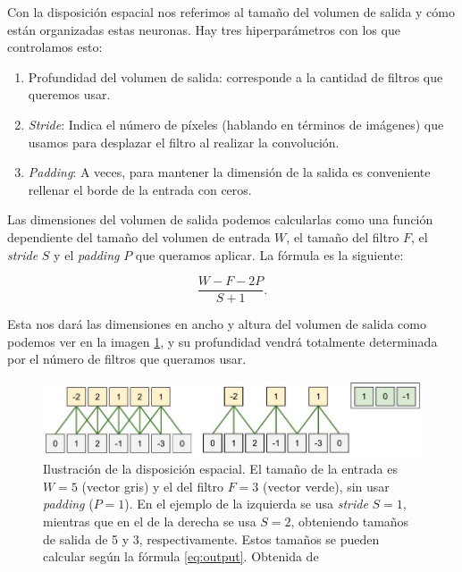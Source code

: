 Con la disposición espacial nos referimos al tamaño del volumen de salida y cómo están organizadas estas neuronas. Hay tres hiperparámetros con los que controlamos esto:

\begin{enumerate}

	\item Profundidad del volumen de salida: corresponde a la cantidad de filtros que queremos usar.
	
	\item \textit{Stride}: Indica el número de píxeles (hablando en términos de imágenes) que usamos para desplazar el filtro al realizar la convolución.
	
	\item \textit{Padding}: A veces, para mantener la dimensión de la salida es conveniente rellenar el borde de la entrada con ceros.

\end{enumerate}


Las dimensiones del volumen de salida podemos calcularlas como una función dependiente del tamaño del volumen de entrada $W$, el tamaño del filtro $F$, el \textit{stride} $S$ y el \textit{padding} $P$ que queramos aplicar. La fórmula es la siguiente:

\begin{equation}\label{eq:output}
\frac{W-F-2P}{S+1}.
\end{equation}

Esta nos dará las dimensiones en ancho y altura del volumen de salida como podemos ver en la imagen \ref{fig:stride}, y su profundidad vendrá totalmente determinada por el número de filtros que queramos usar.

\begin{figure}
    \centering
    \includegraphics[width=0.75\linewidth]{Plantilla_TFG_latex//imagenes//Inf//2.Fund/2.stride.jpeg}
    \caption{Ilustración de la disposición espacial. El tamaño de la entrada es $W=5$ (vector gris) y el del filtro $F=3$ (vector verde), sin usar \textit{padding} ($P=1$). En el ejemplo de la izquierda se usa \textit{stride} $S=1$, mientras que en el de la derecha se usa $S=2$, obteniendo tamaños de salida de 5 y 3, respectivamente. Estos tamaños se pueden calcular según la fórmula \ref{eq:output}. Obtenida de \cite{stanford_231}}
    \label{fig:stride}
\end{figure}


